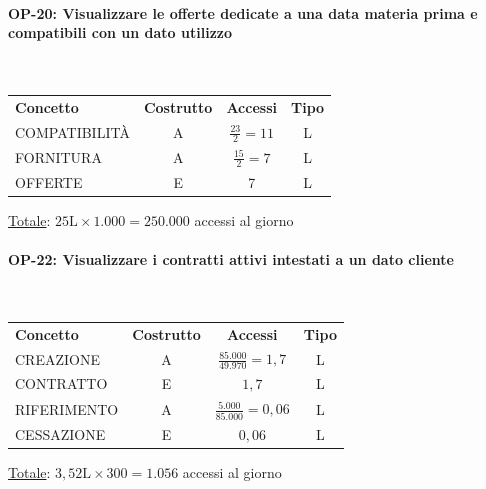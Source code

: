 \documentclass[a4paper,12pt]{report}
\begin{document}
\paragraph{OP-20: Visualizzare le offerte dedicate a una data materia prima e compatibili con un dato utilizzo}\mbox{}\\
    \begin{center}
    \begin{tabular}{@{}l c  c  c@{}}
        \hline
        \textbf{Concetto} & \textbf{Costrutto} & \textbf{Accessi} & \textbf{Tipo} \\ [0.5ex]
        COMPATIBILITÀ & A & $\frac{23}{2} = 11$ & L \\
        FORNITURA & A & $\frac{15}{2} = 7$ & L \\ 
        OFFERTE & E & 7 & L \\
        \hline
    \end{tabular}
    \end{center}
    \underline{Totale}: $25\text{L} \times 1.000 = 250.000$ accessi al giorno
\paragraph{OP-22: Visualizzare i contratti attivi intestati a un dato cliente}\mbox{}\\
\begin{center}
\begin{tabular}{@{}l c  c  c@{}}
    \hline
    \textbf{Concetto} & \textbf{Costrutto} & \textbf{Accessi} & \textbf{Tipo} \\ [0.5ex]
    CREAZIONE & A & $\frac{85.000}{49.970} = 1,7$ & L \\
    CONTRATTO & E & $1,7$ & L \\
    RIFERIMENTO & A & $\frac{5.000}{85.000} = 0,06$ & L \\
    CESSAZIONE & E & $0,06$ & L \\
    \hline
\end{tabular}
\end{center}
\underline{Totale}: $3,52\text{L} \times 300 = 1.056$ accessi al giorno
\end{document}
